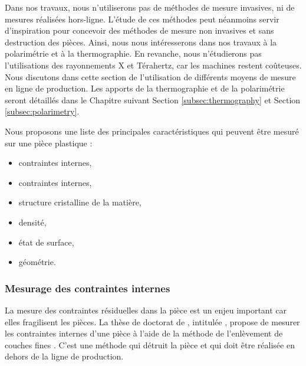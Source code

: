 Dans nos travaux, nous n'utiliserons pas de méthodes de mesure invasives, ni de mesures réalisées hors-ligne.
L'étude de ces méthodes peut néanmoins servir d'inspiration pour concevoir des méthodes de mesure non invasives et sans destruction des pièces.
Ainsi, nous nous intéresserons dans nos travaux à la polarimétrie et à la thermographie.
En revanche, nous n'étudierons pas l'utilisations des rayonnements X et Térahertz, car les machines restent coûteuses.
Nous discutons dans cette section de l'utilisation de différents moyens de mesure en ligne de production.
Les apports de la thermographie et de la polarimétrie seront détaillés dans le Chapitre suivant Section \ref{subsec:thermography} et Section \ref{subsec:polarimetry}.

Nous proposons une liste des principales caractéristiques qui peuvent être mesuré sur une pièce plastique :
\begin{itemize}
	\item contraintes internes,
	\item contraintes internes,
	\item structure cristalline de la matière,
	\item densité,
	\item état de surface,
	\item géométrie.
\end{itemize}

\subsubsection{Mesurage des contraintes internes}
La mesure des contraintes résiduelles dans la pièce est un enjeu important car elles fragilisent les pièces.
La thèse de doctorat de \citeauthor{giroud_mesure_2001}, intitulée , propose de mesurer les contraintes internes d'une pièce à l'aide de la méthode de l'enlèvement de couches fines \cite{giroud_mesure_2001}.
C'est une méthode qui détruit la pièce et qui doit être réalisée en dehors de la ligne de production.

